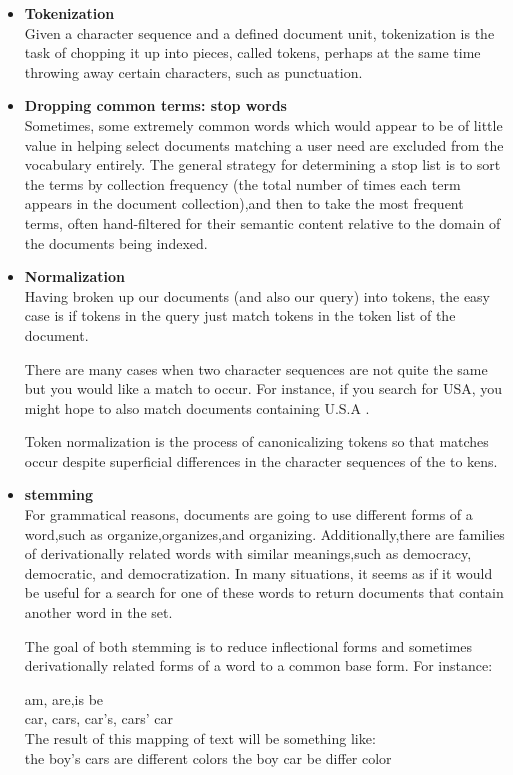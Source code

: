\begin{itemize}
     \item \textbf{Tokenization}\\
     Given a character sequence and a defined document unit, tokenization is the
     task of chopping it up into pieces, called tokens, perhaps at the same time
     throwing away certain characters, such as punctuation.
     
     
     \item \textbf{Dropping common terms: stop words}\\
     Sometimes, some extremely common words which would appear to be of
     little value in helping select documents matching a user need are excluded
     from the vocabulary entirely.
     The general strategy for determining a stop list is to sort the terms by collection frequency (the total number of times each term appears in the document collection),and then to take the most frequent terms, often hand-filtered for their semantic content relative to the domain of the documents being indexed.
     
     
     \item  \textbf{Normalization}\\ 
     Having broken up our documents (and also our query) into tokens, the easy
     case is if tokens in the query just match tokens in the token list of the document.
     
     There are many cases when two character sequences are not quite the same but you would like a match to occur. For instance, if you search for USA, you might hope to also match documents containing U.S.A .
     
     Token normalization is the process of canonicalizing tokens so that matches occur despite superficial differences in the character sequences of the to kens.
    
    \item  \textbf{stemming}\\
    For grammatical reasons, documents are going to use different forms of a word,such as organize,organizes,and organizing. Additionally,there are families of derivationally related words with similar meanings,such as democracy, democratic, and democratization. In many situations, it seems as if it would be useful for a search for one of these words to return documents that contain another word in the set.
    
    The goal of both stemming is to reduce inﬂectional forms and sometimes derivationally related forms of a word to a common base form.
    For instance:
    
    am, are,is \Rightarrow  be \\
    
    car, cars, car’s, cars’ \Rightarrow  car \\
      
    
    The result of this mapping of text will be something like:\\
      
    
    the boy’s cars are different colors  \Rightarrow   the  boy  car  be  differ   color
      
      
\end{itemize} 

